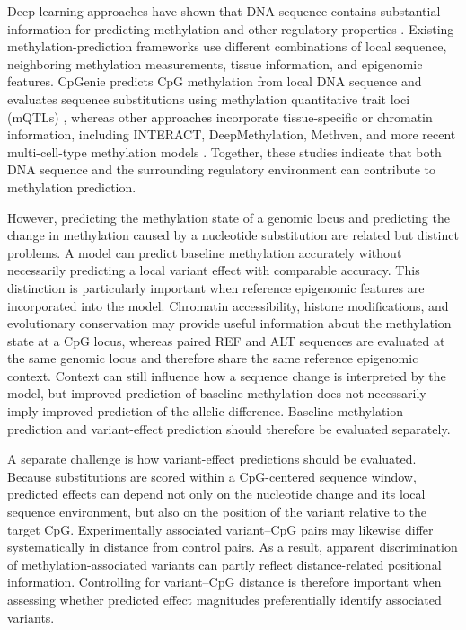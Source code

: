 \documentclass[11pt,letterpaper]{article}
\begin{document}
Deep learning approaches have shown that DNA sequence contains substantial information for predicting methylation and other regulatory properties \cite{angermueller2017deepcpg,zhou2015predicting,avsec2021effective,camillo2024cpgpt}. Existing methylation-prediction frameworks use different combinations of local sequence, neighboring methylation measurements, tissue information, and epigenomic features. CpGenie predicts CpG methylation from local DNA sequence and evaluates sequence substitutions using methylation quantitative trait loci (mQTLs) \cite{zeng2017cpgenie}, whereas other approaches incorporate tissue-specific or chromatin information, including INTERACT, DeepMethylation, Methven, and more recent multi-cell-type methylation models \cite{zhou2022interact,li2026deepmethylation,liu2025methven,jin2026melody}. Together, these studies indicate that both DNA sequence and the surrounding regulatory environment can contribute to methylation prediction.

However, predicting the methylation state of a genomic locus and predicting the change in methylation caused by a nucleotide substitution are related but distinct problems. A model can predict baseline methylation accurately without necessarily predicting a local variant effect with comparable accuracy. This distinction is particularly important when reference epigenomic features are incorporated into the model. Chromatin accessibility, histone modifications, and evolutionary conservation may provide useful information about the methylation state at a CpG locus, whereas paired REF and ALT sequences are evaluated at the same genomic locus and therefore share the same reference epigenomic context. Context can still influence how a sequence change is interpreted by the model, but improved prediction of baseline methylation does not necessarily imply improved prediction of the allelic difference. Baseline methylation prediction and variant-effect prediction should therefore be evaluated separately.

A separate challenge is how variant-effect predictions should be evaluated. Because substitutions are scored within a CpG-centered sequence window, predicted effects can depend not only on the nucleotide change and its local sequence environment, but also on the position of the variant relative to the target CpG. Experimentally associated variant--CpG pairs may likewise differ systematically in distance from control pairs. As a result, apparent discrimination of methylation-associated variants can partly reflect distance-related positional information. Controlling for variant--CpG distance is therefore important when assessing whether predicted effect magnitudes preferentially identify associated variants.
\end{document}

